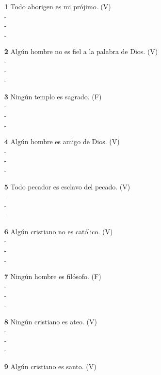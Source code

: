 \documentclass{article}
\begin{document}
    \begin{itemize}
        \item[\textbf{1}] Todo aborigen es mi prójimo. (V) \\
        -\\
        -\\
        -\\
        \item[\textbf{2}] Algún hombre no es fiel a la palabra de Dios. (V) \\
        -\\
        -\\
        -\\
        \item[\textbf{3}] Ningún templo es sagrado. (F) \\
        -\\
        -\\
        -\\
        \item[\textbf{4}] Algún hombre es amigo de Dios. (V) \\
        -\\
        -\\
        -\\
        \item[\textbf{5}] Todo pecador es esclavo del pecado. (V) \\
        -\\
        -\\
        -\\
        \item[\textbf{6}] Algún cristiano no es católico. (V) \\
        -\\
        -\\
        -\\
        \item[\textbf{7}] Ningún hombre es filósofo. (F) \\
        -\\
        -\\
        -\\
        \item[\textbf{8}] Ningún cristiano es ateo. (V) \\
        -\\
        -\\
        -\\
        \item[\textbf{9}] Algún cristiano es santo. (V) \\

\end{itemize}
\end{document}
